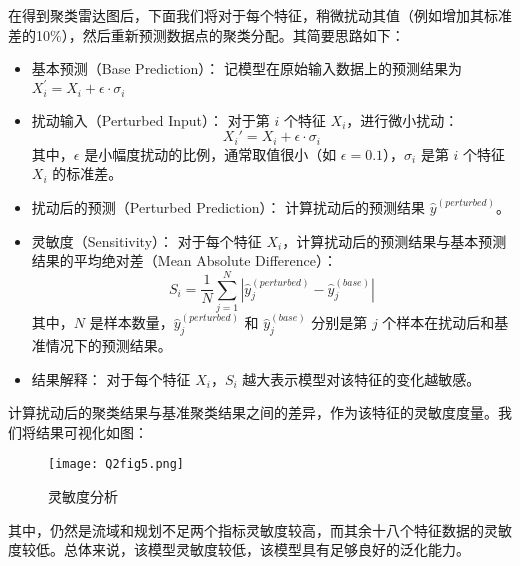 \documentclass[withoutpreface,bwprint]{cumcmthesis} %
\begin{document}
在得到聚类雷达图后，下面我们将对于每个特征，稍微扰动其值（例如增加其标准差的10\%），然后重新预测数据点的聚类分配。其简要思路如下：
\begin{itemize}
	\item 基本预测（Base Prediction）：
	记模型在原始输入数据上的预测结果为$X_i^{'}=X_i+\epsilon \cdot \sigma _i$
	
	\item 扰动输入（Perturbed Input）：
	对于第 \( i \) 个特征 \( X_i \)，进行微小扰动：
	\begin{equation}
	X_i' = X_i + \epsilon \cdot \sigma_i
	\end{equation}
	其中，\( \epsilon \) 是小幅度扰动的比例，通常取值很小（如 \( \epsilon = 0.1 \)），\( \sigma_i \) 是第 \( i \) 个特征 \( X_i \) 的标准差。
	
	\item 扰动后的预测（Perturbed Prediction）：
	计算扰动后的预测结果 \( \hat{y}^{(perturbed)} \)。
	
	\item 灵敏度（Sensitivity）：
	对于每个特征 \( X_i \)，计算扰动后的预测结果与基本预测结果的平均绝对差（Mean Absolute Difference）：
	\begin{equation}
	S_i = \frac{1}{N} \sum_{j=1}^{N} |\hat{y}_j^{(perturbed)} - \hat{y}_j^{(base)}|
	\end{equation}
	其中，\( N \) 是样本数量，\( \hat{y}_j^{(perturbed)} \) 和 \( \hat{y}_j^{(base)} \) 分别是第 \( j \) 个样本在扰动后和基准情况下的预测结果。
	
	\item 结果解释：
	对于每个特征 \( X_i \)，\( S_i \) 越大表示模型对该特征的变化越敏感。
\end{itemize}

计算扰动后的聚类结果与基准聚类结果之间的差异，作为该特征的灵敏度度量。我们将结果可视化如图：

\begin{figure}[htbp]
	\centering
	\texttt{[image: Q2fig5.png]}
	\caption{灵敏度分析}
	\label{Q2fig5.png}
\end{figure}

其中，仍然是流域和规划不足两个指标灵敏度较高，而其余十八个特征数据的灵敏度较低。总体来说，该模型灵敏度较低，该模型具有足够良好的泛化能力。
\end{document}
